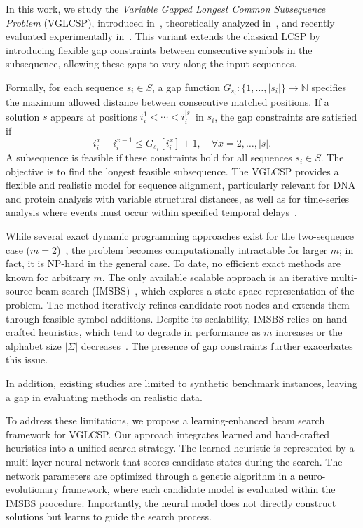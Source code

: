 \documentclass[runningheads]{llncs}
\begin{document}
In this work, we study the \textit{Variable Gapped Longest Common Subsequence Problem} (VGLCSP), introduced in~\cite{penga2011longest}, theoretically analyzed in~\cite{adamson2023longest}, and recently evaluated experimentally in~\cite{djukanovic2026_eurocast}. This variant extends the classical LCSP by introducing flexible gap constraints between consecutive symbols in the subsequence, allowing these gaps to vary along the input sequences.

Formally, for each sequence $s_i \in S$, a gap function $G_{s_i} : \{1,\ldots,|s_i|\} \rightarrow \mathbb{N}$ specifies the maximum allowed distance between consecutive matched positions. If a solution $s$ appears at positions $i_i^1 < \cdots < i_i^{|s|}$ in $s_i$, the gap constraints are satisfied if
\[
i_i^x - i_i^{x-1} \leq G_{s_i}[i_i^x] + 1, \quad \forall x = 2,\ldots,|s|.
\]
A subsequence is feasible if these constraints hold for all sequences $s_i \in S$. The objective is to find the longest feasible subsequence. The VGLCSP provides a flexible and realistic model for sequence alignment, particularly relevant for DNA and protein analysis with variable structural distances, as well as for time-series analysis where events must occur within specified temporal delays~\cite{lainscsek2015delay}.

While several exact dynamic programming approaches exist for the two-sequence case ($m=2$)~\cite{peng2014finding}, the problem becomes computationally intractable for larger $m$; in fact, it is NP-hard in the general case. To date, no efficient exact methods are known for arbitrary $m$. The only available scalable approach is an iterative multi-source beam search (IMSBS)~\cite{djukanovic2026_eurocast}, which explores a state-space representation of the problem. The method iteratively refines candidate root nodes and extends them through feasible symbol additions. Despite its scalability, IMSBS relies on hand-crafted heuristics, which tend to degrade in performance as $m$ increases or the alphabet size $|\Sigma|$ decreases~\cite{DJUKANOVIC2020106499}. The presence of gap constraints further exacerbates this issue.

In addition, existing studies are limited to synthetic benchmark instances, leaving a gap in evaluating methods on realistic data.

To address these limitations, we propose a learning-enhanced beam search framework for VGLCSP. Our approach integrates learned and hand-crafted heuristics into a unified search strategy. The learned heuristic is represented by a multi-layer neural network that scores candidate states during the search. The network parameters are optimized through a genetic algorithm in a neuro-evolutionary framework, where each candidate model is evaluated within the IMSBS procedure. Importantly, the neural model does not directly construct solutions but learns to guide the search process.
\end{document}
